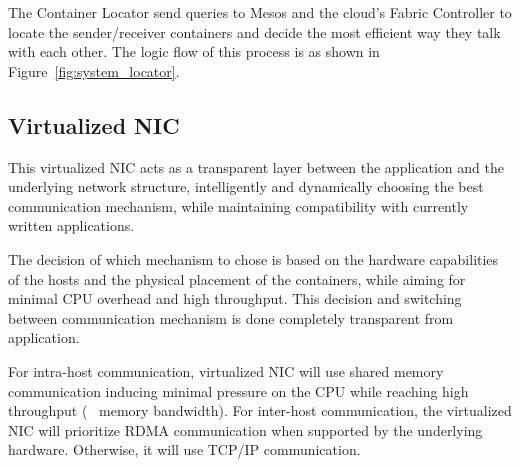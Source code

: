 The Container Locator send queries to Mesos and the cloud's Fabric Controller to locate
the sender/receiver containers and decide the most efficient way they talk with each other.
The logic flow of this process is as shown in Figure~\ref{fig:system_locator}.




\subsection{Virtualized NIC}
This virtualized NIC acts as a transparent layer between the application and the underlying network structure, intelligently and dynamically choosing the best communication mechanism, while maintaining compatibility with currently written applications.

The decision of which mechanism to chose is based on the hardware capabilities of the hosts and the physical placement of the containers, while aiming for minimal CPU overhead and high throughput. This decision and switching between communication mechanism is done completely transparent from application.

For intra-host communication, virtualized NIC will use shared memory communication inducing minimal pressure on the CPU while reaching high throughput (~ memory bandwidth). For inter-host communication, the virtualized NIC will prioritize RDMA communication when supported by the underlying hardware. Otherwise, it will use TCP/IP communication. 


